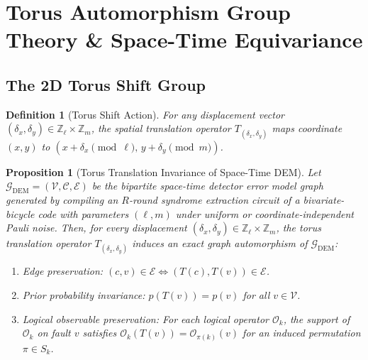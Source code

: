 \documentclass[journal]{IEEEtran}
\newtheorem{definition}{Definition}
\newtheorem{proposition}{Proposition}
\begin{document}
\section{Torus Automorphism Group Theory \& Space-Time Equivariance}

\subsection{The 2D Torus Shift Group}
\begin{definition}[Torus Shift Action]
For any displacement vector $(\delta_x, \delta_y) \in \mathbb{Z}_\ell \times \mathbb{Z}_m$, the spatial translation operator $T_{(\delta_x, \delta_y)}$ maps coordinate $(x, y)$ to $(x + \delta_x \pmod \ell, \, y + \delta_y \pmod m)$.
\end{definition}

\begin{proposition}[Torus Translation Invariance of Space-Time DEM]
\label{thm:automorphism}
Let $\mathcal{G}_{\text{DEM}} = (\mathcal{V}, \mathcal{C}, \mathcal{E})$ be the bipartite space-time detector error model graph generated by compiling an $R$-round syndrome extraction circuit of a bivariate-bicycle code with parameters $(\ell, m)$ under uniform or coordinate-independent Pauli noise. Then, for every displacement $(\delta_x, \delta_y) \in \mathbb{Z}_\ell \times \mathbb{Z}_m$, the torus translation operator $T_{(\delta_x, \delta_y)}$ induces an exact graph automorphism of $\mathcal{G}_{\text{DEM}}$:
\begin{enumerate}
    \item Edge preservation: $(c, v) \in \mathcal{E} \iff (T(c), T(v)) \in \mathcal{E}$.
    \item Prior probability invariance: $p(T(v)) = p(v)$ for all $v \in \mathcal{V}$.
    \item Logical observable preservation: For each logical operator $\mathcal{O}_k$, the support of $\mathcal{O}_k$ on fault $v$ satisfies $\mathcal{O}_k(T(v)) = \mathcal{O}_{\pi(k)}(v)$ for an induced permutation $\pi \in S_k$.
\end{enumerate}
\end{proposition}
\end{document}
